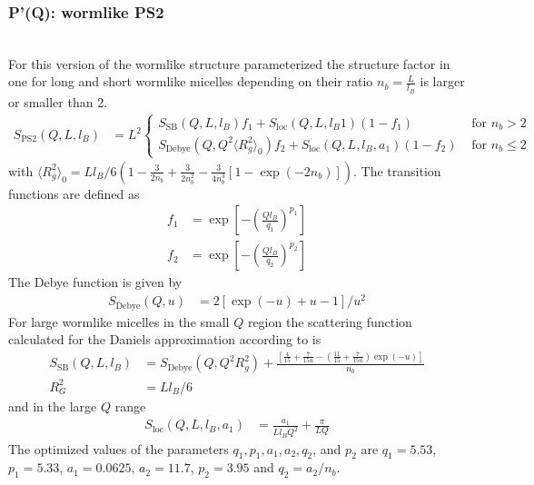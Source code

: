 \clearpage
\subsubsection{P'(Q): wormlike PS2} ~\\
\label{plugin:Pprime4wormPS2}
For this version of the wormlike structure \cite{Pedersen96Macrom} parameterized the structure factor in one for long and short wormlike micelles depending on their ratio $n_b=\frac{L}{l_B}$ is larger or smaller than 2.
\begin{align}
S_\mathrm{PS2}(Q,L,l_B) &= L^2
\begin{cases}
    S_\mathrm{SB}(Q,L,l_B) f_1 + S_\mathrm{loc}(Q,L,l_B1) (1-f_1) & \mbox{ for~}  n_b > 2 \\
    S_\mathrm{Debye}(Q,Q^2\langle R_g^2\rangle_0) f_2 + S_\mathrm{loc}(Q,L,l_B,a_1) (1-f_2) & \mbox{ for~}  n_b \leq 2
\end{cases}
\label{eq:PprimePS2}
\end{align}
with $\langle R_g^2\rangle_0 = Ll_B/6\left(1-\frac{3}{2 n_b}
            +\frac{3}{2 n_b^2}
			-\frac{3}{4 n_b^3}
			\left[1-\exp(-2 n_b)\right]\right)$.
The transition functions are defined as
\begin{align}
f_1 &= \exp\left[-\left(\frac{Ql_B}{q_1}\right)^{p_1}\right] \\
f_2 &= \exp\left[-\left(\frac{Ql_B}{q_2}\right)^{p_2}\right]
\end{align}
The Debye function is given by
\begin{align}
S_\mathrm{Debye}(Q,u) &= 2\left[\exp(-u)+u-1\right]/u^2
\end{align}
For large wormlike micelles in the small $Q$ region the scattering function calculated for the
Daniels approximation \cite{Daniels1952} according to \cite{Sharp1968,Pedersen96Macrom} is
\begin{align}
S_\mathrm{SB}(Q,L,l_B) &= S_\mathrm{Debye}(Q,Q^2 R_g^2)+
    \frac{\left[\frac{4}{15} +\frac{7}{15u}-\left(\frac{11}{15}+\frac{7}{15u}\right)\exp(-u)\right]}{n_b}\\
R_G^2 &=Ll_B/6
\end{align}
and in the large $Q$ range
\begin{align}
S_\mathrm{loc}(Q,L,l_B,a_1) &= \frac{a_1}{Ll_BQ^2} + \frac{\pi}{LQ}
\end{align}
The optimized values of the parameters $q_1,p_1, a_1, a_2, q_2$, and $ p_2$ are
$q_1 = 5.53$, $p_1 = 5.33$, $a_1 = 0.0625$, $a_2 = 11.7$, $p_2 = 3.95$ and
$q_2 = a_2/n_b$.

